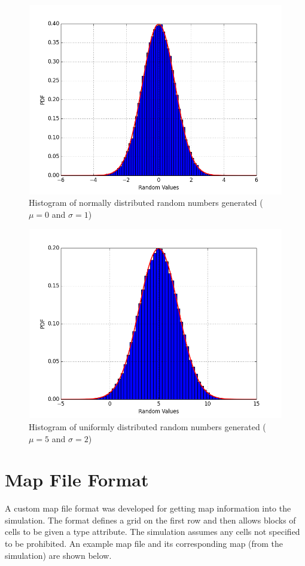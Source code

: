 \documentclass[paper=a4, fontsize=11pt]{scrartcl}
\numberwithin{equation}{section}		%
\numberwithin{figure}{section}			%
\numberwithin{table}{section}		    %
\begin{document}
\begin{appendices}
\begin{figure}[H]
	\begin{center} 
		\includegraphics[height=3.3in,width=4.5in]{normal_rng} 
		\caption{Histogram of normally distributed random numbers generated ($\mu = 0$ and 
			$\sigma=1$)\label{fig:A:NRNG}}
	\end{center} 
\end{figure}

\begin{figure}[H]
	\begin{center} 
		\includegraphics[height=3.3in,width=4.5in]{normal_rng_mu=5_sigma=2} 
		\caption{Histogram of uniformly distributed random numbers generated ($\mu = 5$ and 
		$\sigma=2$)\label{fig:A:NRNG5}}
	\end{center} 
\end{figure}

\newpage
\section{Map File Format}\label{sec:A:map}
A custom map file format was developed for getting map information into the simulation. The 
format defines a grid on the first row and then allows blocks of cells to be given a type 
attribute. The simulation assumes any cells not specified to be prohibited. An example map 
file and its corresponding map (from the simulation) are shown below. 


\end{appendices}
\end{document}
